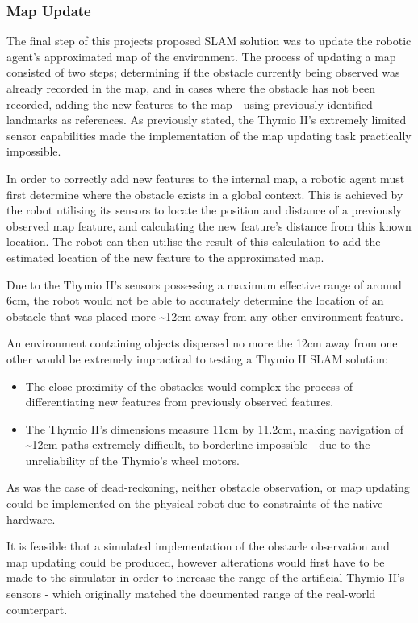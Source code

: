 \subsubsection{Map Update}
The final step of this projects proposed SLAM solution was to update the
robotic agent's approximated map of the environment.
The process of updating a map consisted of two steps; determining if the
obstacle currently being observed was already recorded in the map, and in cases
where the obstacle has not been recorded, adding the new features to the map -
using previously identified landmarks as references. 
As previously stated, the Thymio II's extremely limited sensor capabilities
made the implementation of the map updating task practically impossible.

In order to correctly add new features to the internal map, a robotic agent
must first determine where the obstacle exists in a global context.
This is achieved by the robot utilising its sensors to locate the position
and distance of a previously observed map feature, and calculating the new
feature's distance from this known location.
The robot can then utilise the result of this calculation to add the estimated
location of the new feature to the approximated map.

Due to the Thymio II's sensors possessing a maximum effective range of around
6cm, the robot would not be able to accurately determine the location of an
obstacle that was placed more \~{}12cm away from any other environment feature.

An environment containing objects dispersed no more the 12cm away from one
other would be extremely impractical to testing a Thymio II SLAM solution:
\begin{itemize}
\item The close proximity of the obstacles would complex the process of
differentiating new features from previously observed features.
\item The Thymio II's dimensions measure 11cm by 11.2cm, making navigation of
\~{}12cm paths extremely difficult, to borderline impossible - due to the
unreliability of the Thymio's wheel motors.
\end{itemize}

As was the case of dead-reckoning, neither obstacle observation, or map
updating could be implemented on the physical robot due to constraints of the
native hardware.

It is feasible that a simulated implementation of the obstacle observation and
map updating could be produced, however alterations would first have
to be made to the simulator in order to increase the range of the artificial
Thymio II's sensors - which originally matched the documented range of the
real-world counterpart.

